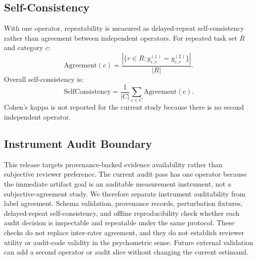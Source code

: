 \documentclass[10pt,conference]{IEEEtran}
\begin{document}
\subsection{Self-Consistency}

With one operator, repeatability is measured as delayed-repeat self-consistency rather than agreement between independent operators.
For repeated task set $R$ and category $c$:
\begin{equation}
\mathrm{Agreement}(c)=
\frac{|\{r \in R : y_{r,c}^{(1)}=y_{r,c}^{(2)}\}|}{|R|}.
\end{equation}
Overall self-consistency is:
\begin{equation}
\mathrm{SelfConsistency}=
\frac{1}{|C|}\sum_{c \in C}\mathrm{Agreement}(c).
\end{equation}
Cohen's kappa is not reported for the current study because there is no second independent operator.

\subsection{Instrument Audit Boundary}

This release targets provenance-backed evidence availability rather than subjective reviewer preference.
The current audit pass has one operator because the immediate artifact goal is an auditable measurement instrument, not a subjective-agreement study.
We therefore separate instrument auditability from label agreement.
Schema validation, provenance records, perturbation fixtures, delayed-repeat self-consistency, and offline reproducibility check whether each audit decision is inspectable and repeatable under the same protocol.
These checks do not replace inter-rater agreement, and they do not establish reviewer utility or audit-code validity in the psychometric sense.
Future external validation can add a second operator or audit slice without changing the current estimand.
\end{document}
